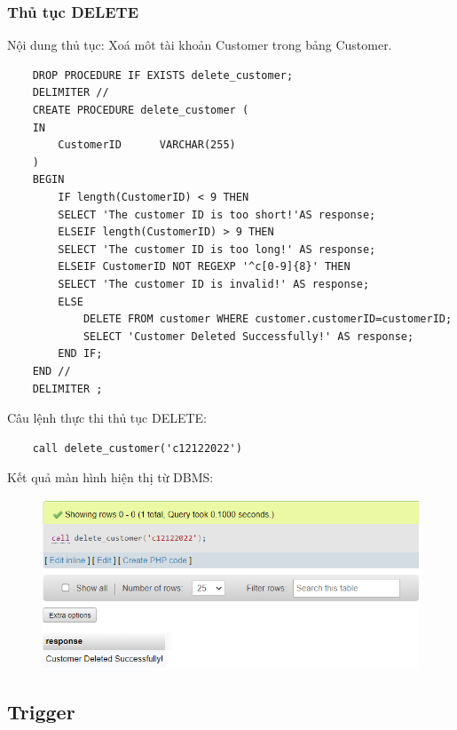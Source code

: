     \subsubsection{Thủ tục DELETE}
    Nội dung thủ tục: Xoá môt tài khoản Customer trong bảng Customer.      
    \begin{verbatim}
    DROP PROCEDURE IF EXISTS delete_customer;
    DELIMITER //
    CREATE PROCEDURE delete_customer (
    IN
        CustomerID		VARCHAR(255)
    )
    BEGIN
        IF length(CustomerID) < 9 THEN
        SELECT 'The customer ID is too short!'AS response;
        ELSEIF length(CustomerID) > 9 THEN
        SELECT 'The customer ID is too long!' AS response;
        ELSEIF CustomerID NOT REGEXP '^c[0-9]{8}' THEN
        SELECT 'The customer ID is invalid!' AS response;
        ELSE
            DELETE FROM customer WHERE customer.customerID=customerID;
            SELECT 'Customer Deleted Successfully!' AS response;
        END IF;
    END //
    DELIMITER ;
  \end{verbatim}
Câu lệnh thực thi thủ tục DELETE:
\begin{verbatim}
    call delete_customer('c12122022')
\end{verbatim}
Kết quả màn hình hiện thị từ DBMS:

\begin{figure}[h]
    \centering
    \includegraphics{images/deleteCustomer.png}
\end{figure}
   
    
\subsection{Trigger}
